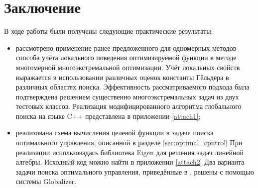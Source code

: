 \section{Заключение}
В ходе работы были получены следующие практические результаты:
\begin{itemize}
  \item рассмотрено применение ранее предложенного для одномерных методов способа учёта
  локального поведения оптимизируемой функции в методе многомерной многоэкстремальной
  оптимизации. Учёт локальных свойств выражается в использовании различных оценок
  константы Гёльдера в различных областях поиска. Эффективность рассматриваемого подхода
  была подтверждена решением существенно многоэкстремальных задач из двух тестовых классов.
  Реализация модифицированного алгоритма глобального поиска на языке C++ представлена
  в приложении \ref{attach1};
  \item реализована схема вычисления целевой функции в задаче поиска оптимального управления,
  описанной в разделе \ref{sec:optimal_cpntrol}
  При реализации использовадась библиотека Eigen \cite{eigenLib} для решения задач
  линейной алгебры. Исходный код можно найти в приложении \ref{attach2}
  Два варианта задачи поиска оптимального управления,
  приведённые в \cite{optControl}, решены с помощью системы Globalizer.
\end{itemize}
